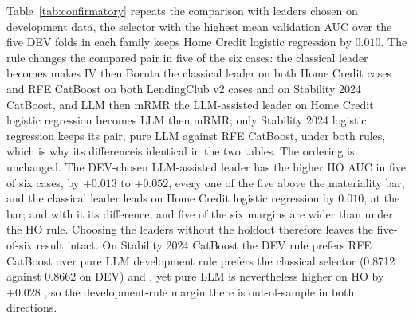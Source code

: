 \documentclass[final,5p,twocolumn]{elsarticle}
\providecommand{\DIFaddtex}[1]{{\protect\color{blue} \sf #1}} %
\providecommand{\DIFdeltex}[1]{{\protect\color{red} \scriptsize #1}} %
\providecommand{\DIFaddbegin}{} %
\providecommand{\DIFaddend}{} %
\providecommand{\DIFdelbegin}{} %
\providecommand{\DIFdelend}{} %
\providecommand{\DIFadd}[1]{\texorpdfstring{\DIFaddtex{#1}}{#1}} %
\providecommand{\DIFdel}[1]{\texorpdfstring{\DIFdeltex{#1}}{}} %
\begin{document}
\DIFdel{Table~\ref{tab:confirmatory} repeats the comparison with leaders chosen on development data, the selector with the highest mean validation AUC over the five DEV folds in each family}\DIFdelend \DIFaddbegin \DIFadd{keeps Home Credit logistic regression by $0.010$}\DIFaddend . The rule \DIFdelbegin \DIFdel{changes the compared pair in five of the six cases: the classical leader becomes }\DIFdelend \DIFaddbegin \DIFadd{makes }\DIFaddend IV then Boruta \DIFaddbegin \DIFadd{the classical leader }\DIFaddend on both Home Credit cases and RFE CatBoost on both LendingClub v2 cases and on Stability 2024 CatBoost, and \DIFaddbegin \DIFadd{LLM then mRMR }\DIFaddend the LLM-assisted leader on Home Credit logistic regression\DIFdelbegin \DIFdel{becomes LLM then mRMR}\DIFdelend ; only Stability 2024 logistic regression keeps its pair, pure LLM against RFE CatBoost, \DIFdelbegin \DIFdel{under both rules, which is why its differenceis identical in the two tables. The ordering is unchanged. The DEV-chosen LLM-assisted leader has the higher HO AUC in five of six cases, by $+0.013$ to $+0.052$, every one of the five above the materiality bar, and the classical leader leads on Home Credit logistic regression by $0.010$, at the bar; }\DIFdelend \DIFaddbegin \DIFadd{and with it its difference, and }\DIFaddend five of the six margins are wider than under the HO rule. \DIFdelbegin \DIFdel{Choosing the leaders without the holdout therefore leaves the five-of-six result intact. }\DIFdelend On Stability 2024 CatBoost the \DIFdelbegin \DIFdel{DEV rule prefers RFE CatBoost over pure LLM }\DIFdelend \DIFaddbegin \DIFadd{development rule prefers the classical selector }\DIFaddend (0.8712 against 0.8662 on DEV)\DIFdelbegin \DIFdel{and }\DIFdelend \DIFaddbegin \DIFadd{, yet }\DIFaddend pure LLM is \DIFdelbegin \DIFdel{nevertheless }\DIFdelend higher on HO by $+0.028$\DIFdelbegin \DIFdel{, so the development-rule margin there is out-of-sample in both directions}\DIFdelend .
\end{document}

